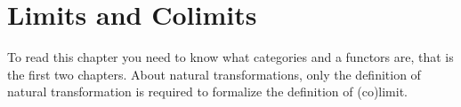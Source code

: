 
\chapter{Limits and Colimits}

To read this chapter you need to know what categories and a functors are, that is the first two chapters. About natural transformations, only the definition of natural transformation is required to formalize the definition of (co)limit.







%


